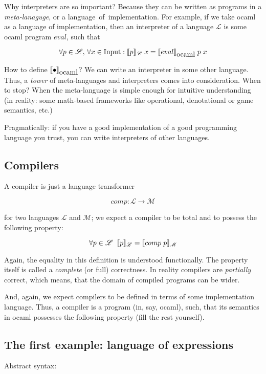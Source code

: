 Why interpreters are so important? Because they can be written as programs in a \emph{meta-lanaguge}, or a \mbox{language of implementation}. For example,
if we take ocaml as a language of implementation, then an interpreter of a language $\mathscr L$ is some ocaml program $eval$, such that

$$
\forall p \in \mathscr L,\, \forall x\in \mbox{\lstinline|Input|} : \sembr{p}_{\mathscr L}\;x = \sembr{eval}_{\mbox{ocaml}}\; p\; x
$$

How to define $\llbracket{\bullet}\rrbracket_{\mbox{ocaml}}$? We can write an interpreter in some other language. Thus, a \emph{tower} of meta-languages and interpreters
comes into consideration. When to stop? When the meta-language is simple enough for intuitive understanding (in reality: some math-based frameworks like
operational, denotational or game semantics, etc.)

Pragmatically: if you have a good implementation of a good programming language you trust, you can write interpreters of other languages.

\subsection{Compilers}

A compiler is just a language transformer

$$
comp :\mathscr L \to \mathscr M
$$

for two languages $\mathscr L$ and $\mathscr M$; we expect a compiler to be total and to possess the following property:

$$
\forall p\in\mathscr L\;\;\llbracket{p}\rrbracket_{\mathscr L}=\llbracket{comp\; p}\rrbracket_{\mathscr M}
$$

Again, the equality in this definition is understood functionally. The property itself is called a \emph{complete} (or full) correctness. In reality
compilers are \emph{partially} correct, which means, that the domain of compiled programs can be wider.

And, again, we expect compilers to be defined in terms of some implementation language. Thus, a compiler is a program (in, say, ocaml), such, that
its semantics in ocaml possesses the following property (fill the rest yourself).


\subsection{The first example: language of expressions}

Abstract syntax:

